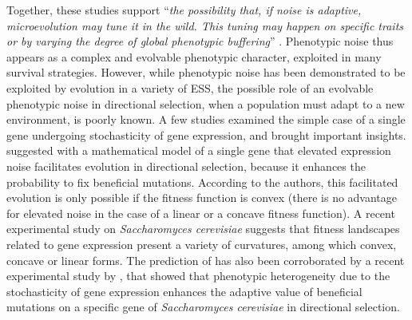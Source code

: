 Together, these studies support ``\textit{the possibility that, if noise is adaptive, microevolution may tune it in the wild. This tuning may happen on specific traits or by varying the degree of global phenotypic buffering}'' \citep{yvert-et-al-2013}. Phenotypic noise thus appears as a complex and evolvable phenotypic character, exploited in many survival strategies. However, while phenotypic noise has been demonstrated to be exploited by evolution in a variety of ESS, the possible role of an evolvable phenotypic noise in directional selection, when a population must adapt to a new environment, is poorly known.
A few studies examined the simple case of a single gene undergoing stochasticity of gene expression, and brought important insights. \cite{zhang-et-al-2009} suggested with a mathematical model of a single gene that elevated expression noise facilitates evolution in directional selection, because it enhances the probability to fix beneficial mutations. According to the authors, this facilitated evolution is only possible if the fitness function is convex (there is no advantage for elevated noise in the case of a linear or a concave fitness function). A recent experimental study on \textit{Saccharomyces cerevisiae} \citep{keren-et-al-2016} suggests that fitness landscapes related to gene expression present a variety of curvatures, among which convex, concave or linear forms.
The prediction of \cite{zhang-et-al-2009} has also been corroborated by a recent experimental study by \cite{bodi-et-al-2017}, that showed that phenotypic heterogeneity due to the stochasticity of gene expression enhances the adaptive value of beneficial mutations on a specific gene of \textit{Saccharomyces cerevisiae} in directional selection.

